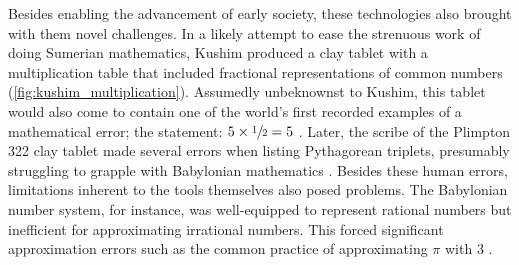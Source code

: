 Besides enabling the advancement of early society, these technologies also brought with them novel challenges. 
In a likely attempt to ease the strenuous work of doing Sumerian mathematics, Kushim produced a clay tablet with a multiplication table that included fractional representations of common numbers (\cref{fig:kushim_multiplication}). Assumedly unbeknownst to Kushim, this tablet would also come to contain one of the world's first recorded examples of a mathematical error; the statement: $5 \times \sfrac{1}{2} = 5$ \parencite{nissen_archaic_1993}. 
Later, the scribe of the Plimpton 322 clay tablet made several errors when listing Pythagorean triplets, presumably struggling to grapple with Babylonian mathematics \parencite{neugebauer_mathematical_1945,britton_plimpton_2011,cuneiformdigitallibraryinitiativecdli_mct_2005}. 
Besides these human errors, limitations inherent to the tools themselves also posed problems. 
The Babylonian number system, for instance, was well-equipped to represent rational numbers but inefficient for approximating irrational numbers. 
This forced significant approximation errors such as the common practice of approximating $\pi$ with 3 \parencite{georges_universal_2001}. 



